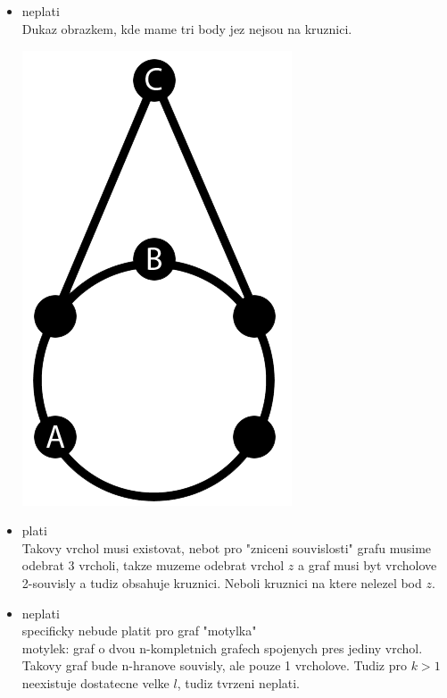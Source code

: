 \documentclass[a4paper]{article}
\begin{document}
\subsection{}
\begin{itemize}
\item neplati\\
Dukaz obrazkem, kde mame tri body jez nejsou na kruznici.\\
\begin{center}
    \includegraphics[scale=0.3]{notBipartial.png}    
\end{center}

\item plati\\
Takovy vrchol musi existovat, nebot pro "zniceni souvislosti" grafu musime
odebrat 3 vrcholi, takze muzeme odebrat vrchol $z$ a graf musi byt vrcholove
2-souvisly a tudiz obsahuje kruznici. Neboli kruznici na ktere nelezel bod $z$.

\item neplati\\
specificky nebude platit pro graf "motylka"\\
motylek: graf o dvou n-kompletnich grafech spojenych pres jediny vrchol.
Takovy graf bude n-hranove souvisly, ale pouze 1 vrcholove.
Tudiz pro $k>1$ neexistuje dostatecne velke $l$, tudiz tvrzeni neplati.
\end{itemize}
\end{document}
